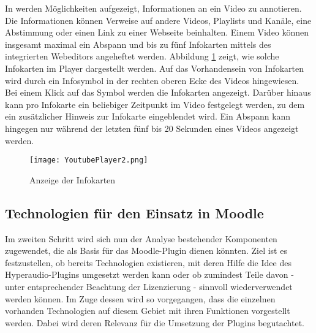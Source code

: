 In \citep{youtubeinfokarten,youtubeabspann} werden Möglichkeiten aufgezeigt, Informationen an ein Video zu annotieren. Die Informationen können Verweise auf andere Videos, Playlists und Kanäle, eine Abstimmung oder einen Link zu einer Webseite beinhalten. Einem Video können insgesamt maximal ein Abspann und bis zu fünf Infokarten mittels des integrierten Webeditors angeheftet werden. Abbildung \ref{fig:YoutubePlayer2} zeigt, wie solche Infokarten im Player dargestellt werden. Auf das Vorhandensein von Infokarten wird durch ein Infosymbol in der rechten oberen Ecke des Videos hingewiesen. Bei einem Klick auf das Symbol werden die Infokarten angezeigt. Darüber hinaus kann pro Infokarte ein beliebiger Zeitpunkt im Video festgelegt werden, zu dem ein zusätzlicher Hinweis zur Infokarte eingeblendet wird. Ein Abspann kann hingegen nur während der letzten fünf bis 20 Sekunden eines Videos angezeigt werden.

\begin{figure}[h!]
\texttt{[image: YoutubePlayer2.png]}
\caption{\label{fig:YoutubePlayer2}Anzeige der Infokarten \citep{Youtube2015Panic}}
\end{figure}


\subsection{Technologien für den Einsatz in Moodle}
\label{sub:TechnologienMoodle}
Im zweiten Schritt wird sich nun der Analyse bestehender Komponenten zugewendet, die als Basis für das Moodle-Plugin dienen könnten. Ziel ist es festzustellen, ob bereits Technologien existieren, mit deren Hilfe die Idee des Hyperaudio-Plugins umgesetzt werden kann oder ob zumindest Teile davon - unter entsprechender Beachtung der Lizenzierung - sinnvoll wiederverwendet werden können. Im Zuge dessen wird so vorgegangen, dass die einzelnen vorhanden Technologien auf diesem Gebiet mit ihren Funktionen vorgestellt werden. Dabei wird deren Relevanz für die Umsetzung der Plugins begutachtet.

